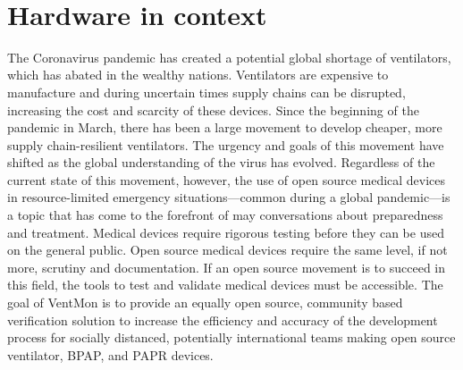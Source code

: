 \documentclass[11pt, letterpaper]{article}
\begin{document}
\begin{flushleft}
\begin{tabu}
\\\hline
\end{tabu}
\end{flushleft}

\section{Hardware in context}
The Coronavirus pandemic has created a potential global shortage of ventilators\cite{pearce2020review}, which has abated in the wealthy nations.
Ventilators are expensive to manufacture and during uncertain times supply chains can be disrupted, increasing the cost and scarcity of these devices. Since the beginning of the pandemic in March,
there has been a large movement to develop cheaper,
more supply chain-resilient ventilators.
The urgency and goals of this movement have shifted as the global understanding of the virus has evolved. Regardless of the current state of this movement, however, the use of
open source medical devices in resource-limited emergency situations---common during a global pandemic---is a topic that has come to the forefront of may conversations about preparedness and treatment.
Medical devices require rigorous testing before they can be used on the general public.
Open source medical devices require the same level, if not more, scrutiny and documentation. If an open source movement is to succeed in this field, the tools to test and validate medical
devices must be accessible.
The goal of VentMon is to provide an equally open source, community based verification solution to increase the efficiency and accuracy of the development process for socially distanced,
potentially international teams making open source ventilator, BPAP, and PAPR devices.
\end{document}
